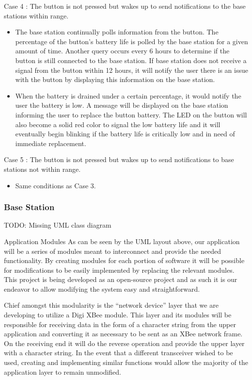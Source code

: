 \documentclass[journal]{IEEEtran}
\begin{document}
\begin{LaTeXdescription}
\begin{itemize}
  \end{itemize}
\item[Case 4]:  The button is not pressed but wakes up to send notifications to the base stations within range.
  \begin{itemize}
    \item The base station continually polls information from the button.  The percentage of the button’s battery life is polled by the base station for a given amount of time.  Another query occurs every 6 hours to determine if the button is still connected to the base station.  If base station does not receive a signal from the button within 12 hours, it will notify the user there is an issue with the button by displaying this information on the base station.
    \item When the battery is drained under a certain percentage, it would notify the user the battery is low.  A message will be displayed on the base station informing the user to replace the button battery.  The LED on the button will also become a solid red color to signal the low battery life and it will eventually begin blinking if the battery life is critically low and in need of immediate replacement.
  \end{itemize}
\item[Case 5]:  The button is not pressed but wakes up to send notifications to base stations not within range.
  \begin{itemize}
    \item Same conditions as Case 3.
  \end{itemize}
\end{LaTeXdescription}

\subsubsection{Base Station}

TODO: Missing UML class diagram

Application Modules
As can be seen by the UML layout above, our application will be a series of modules meant to interconnect and provide the needed functionality. By creating modules for each portion of software it will be possible for modifications to be easily implemented by replacing the relevant modules. This project is being developed as an open-source project and as such it is our endeavor to allow modifying the system easy and straightforward.

Chief amongst this modularity is the “network device” layer that we are developing to utilize a Digi XBee module. This layer and its modules will be responsible for receiving data in the form of a character string from the upper application and converting it as necessary to be sent as an XBee network frame. On the receiving end it will do the reverse operation and provide the upper layer with a character string. In the event that a different transceiver wished to be used, creating and implementing similar functions would allow the majority of the application layer to remain unmodified.
\end{document}
